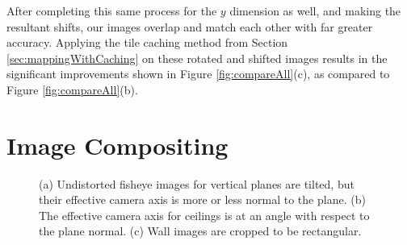 \documentclass[]{spie}  %
\begin{document}
After completing this same process for the $y$ dimension as well, and
making the resultant shifts, our images overlap and match each other
with far greater accuracy. Applying the tile caching method from
Section \ref{sec:mappingWithCaching} on these rotated and shifted
images results in the significant improvements shown in Figure
\ref{fig:compareAll}(c), as compared to Figure
\ref{fig:compareAll}(b).


\section{Image Compositing}

\begin{figure}
  \centering
  \centering
  \centering
  \caption{(a) Undistorted fisheye images for vertical planes are
    tilted, but their effective camera axis is more or less normal to
    the plane. (b) The effective camera axis for ceilings is at an
    angle with respect to the plane normal. (c) Wall images are
    cropped to be rectangular.}
  \label{fig:projectionAngles}
\end{figure}
\end{document}
